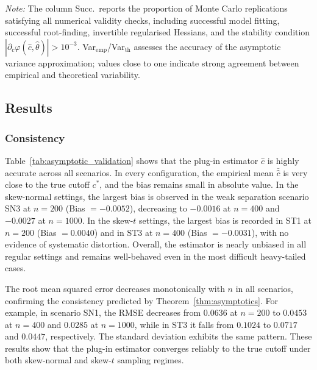 \documentclass[11pt,a4paper]{article}
\theoremstyle{definition}
\theoremstyle{remark}
\newcommand{\1}{\mathbf{1}}
\begin{document}
\begin{table}[h!]
\begin{tablenotes}
\item {\it Note:} The column Succ.\ reports the proportion of Monte Carlo replications satisfying all numerical validity checks,
including successful model fitting, successful root-finding,
invertible regularised Hessians, and the stability condition
$|\partial_c\varphi(\hat c,\hat\theta)|>10^{-3}$. Var$_{\mathrm{emp}}$/Var$_{\mathrm{th}}$ assesses the accuracy of the asymptotic variance approximation; values close to one indicate strong agreement between empirical and theoretical variability. 
\end{tablenotes}
\end{table}

\subsection{Results}

\subsubsection{Consistency}

Table~\ref{tab:asymptotic_validation} shows that the plug-in estimator $\hat c$ is highly accurate across all scenarios. In every
configuration, the empirical mean $\bar{\hat c}$ is very close to the
true cutoff $c^*$, and the bias remains small in absolute value. In the skew-normal settings, the largest bias is observed in the weak
separation scenario SN3 at $n=200$ (Bias $=-0.0052$), decreasing to
$-0.0016$ at $n=400$ and $-0.0027$ at $n=1000$. In the skew-$t$
settings, the largest bias is recorded in ST1 at $n=200$
(Bias $=0.0040$) and in ST3 at $n=400$ (Bias $=-0.0031$), with no
evidence of systematic distortion. Overall, the estimator is nearly
unbiased in all regular settings and remains well-behaved even in the
most difficult heavy-tailed cases.

The root mean squared error decreases monotonically with $n$ in all
scenarios, confirming the consistency predicted by Theorem~\ref{thm:asymptotics}. For example, in scenario SN1, the RMSE
decreases from $0.0636$ at $n=200$ to $0.0453$ at $n=400$ and $0.0285$ at $n=1000$, while in ST3 it falls from $0.1024$ to $0.0717$ and $0.0447$, respectively. The standard deviation exhibits the same pattern. These results show that the plug-in estimator converges reliably to the true cutoff under both skew-normal and skew-$t$ sampling regimes.
\end{document}
